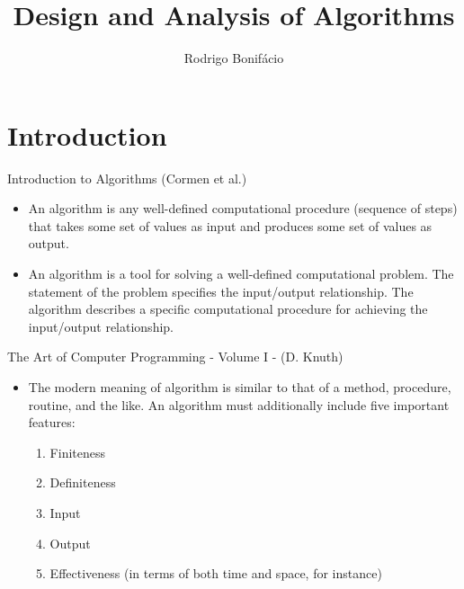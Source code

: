 \documentclass{beamer}
\title{Design and Analysis of Algorithms}
\author{Rodrigo Bonif\'{a}cio}
\begin{document}
\begin{frame}
\titlepage
\end{frame}

\section{Introduction}

\begin{frame}

  \begin{block}{Introduction to Algorithms (Cormen et al.)}
  \begin{itemize}
    \item An algorithm is any well-defined computational procedure (sequence of
    steps) that takes some set of values as input and produces some set of values
    as output. \pause

  \item An algorithm is a tool for solving a well-defined computational problem. The
    statement of the problem specifies the input/output relationship. The
    algorithm describes a specific computational procedure for achieving the
    input/output relationship.
  \end{itemize}
  \end{block}

  
  
\end{frame}

\begin{frame}

  \begin{block}{The Art of Computer Programming - Volume I - (D. Knuth)}
    \begin{itemize}
      \item The modern meaning of algorithm is similar to that of
      a method, procedure, routine, and the like. \pause An algorithm must
      additionally include five important features\pause:

      \begin{enumerate}
       \item Finiteness
       \item Definiteness
       \item Input
       \item Output
       \item Effectiveness \pause(in terms of both time and space, for instance)  
      \end{enumerate}
   \end{itemize}   
  \end{block}  
\end{frame}
\end{document}
